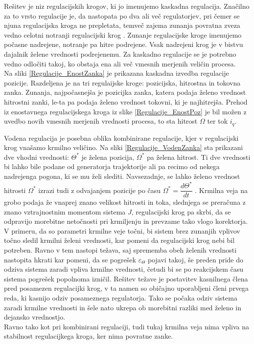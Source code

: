 \documentclass[a4paper,twoside,openright,12pt]{book}
\begin{document}
Rešitev je niz regulacijskih krogov, ki jo imenujemo kaskadna regulacija. Značilno za to vrsto regulacije je, da nastopata po dva ali več regulatorjev, pri čemer se njuna regulacijska kroga ne prepletata, temveč zajema zunanja povratna zveza vedno celotni notranji regulacijski krog \cite{Cajhen1990regulacije}. Zunanje regulacijske kroge imenujemo počasne nadrejene, notranje pa hitre podrejene. Vsak nadrejeni krog je v bistvu dajalnik želene vrednosti podrejenemu. Za kaskadno regulacije se je potrebno vedno odločiti takoj, ko obstaja ena ali več vmesnih merjenih veličin procesa. \\
Na sliki \ref{Regulacije_EnostZanka} je prikazana kaskadna izvedba regulacije pozicije. Razdeljena je na tri regulaijske kroge: pozicijska, hitrostna in tokovna zanka. Zunanja, najpočasnejša je pozicijka zanka, katera podaja želeno vrednost hitrostni zanki, le-ta pa podaja želeno vrednost tokovni, ki je najhitrejša. Prehod iz enostavnega regulacijskega kroga iz slike \ref{Regulacije_EnostPoz} je bil možen z uvedbo novih vmesnih merjenih vrednosti procesa, to sta hitrost $\Omega$ ter tok $i_q$.

Vodena regulacija je posebna oblika kombinirane regulacije, kjer v regulacijski krog vnašamo krmilno veličino. Na sliki \ref{Regulacije_VodenZanka} sta prikazani dve vhodni vrednosti: $\Theta^*$ je želena pozicija, $\Omega^*$ pa želena hitrost. Ti dve vrednosti bi lahko bile podane od generatorja trajektorije ali pa recimo od nekega nadrejenga pogona, ki se mu želi slediti. Navsezadnje, se lahko želeno vrednost hitrosti $\Omega^*$ izrazi tudi z odvajanjem pozicije po času $\Omega^*=\dfrac{d\Theta^*}{dt}$ . Krmilna veja na grobo podaja že vnaprej znano velikost hitrosti in toka, slednjega se preračuna z znano vztrajnostnim momentom sistema $J$, regulacijski krog pa skrbi, da se odpravijo morebitne netočnosti pri krmiljenju in prevzame tako vlogo korektorja. V primeru, da so parametri krmilne veje točni, bi sistem brez zunanjih vplivov točno sledil krmilni želeni vrednosti, kar pomeni da regulacijski krog nebi bil potreben. Ravno v tem nastopi težava, saj sprememba obeh želenih vrednosti nastopita hkrati kar pomeni, da se pogrešek $\varepsilon_{\Theta} $ pojavi takoj, še preden pride do odziva sistema zaradi vpliva krmilne vrednosti, četudi bi se po reakcijskem času sistema pogrešek popolnoma izničil. Rešitev težave je postavitev kasnilnega člena pred posamezen regulacijki krog, v ta namen so običajno uporabljeni členi prvega reda, ki kasnijo odziv posameznega regulatorja. Tako se počaka odziv sistema zaradi krmilne vrednosti in šele nato ukrepa ob morebitni razliki med želeno in dejansko vrednostjo.\\
Ravno tako kot pri kombinirani regulaciji, tudi tukaj krmilna veja nima vpliva na stabilnost regulacijkega kroga, ker nima povratne zanke. 
\end{document}
